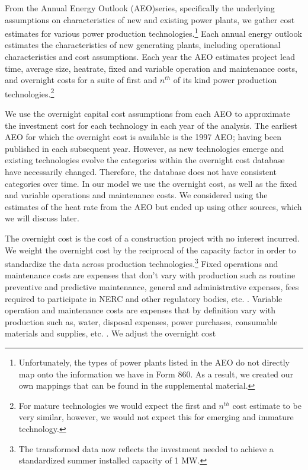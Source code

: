 \documentclass[10pt]{amsart}
\begin{document}
From the Annual Energy Outlook (AEO)series, specifically the underlying assumptions on characteristics of new and existing power plants, we gather cost estimates for various power production technologies.\footnote{Unfortunately, the types of power plants listed in the AEO do not directly map onto the information we have in Form 860.
As a result, we created our own mappings that can be found in the supplemental material.}
Each annual energy outlook estimates the characteristics of new generating plants, including operational characteristics and cost assumptions.
Each year the AEO estimates project lead time, average size, heatrate, fixed and variable operation and maintenance costs, and overnight costs for a suite of first and $n^{th}$ of its kind power production technologies.\footnote{For mature technologies we would expect the first and $n^{th}$ cost estimate to be very similar, however, we would not expect this for emerging and immature technology.}

We use the overnight capital cost assumptions from each AEO to approximate the investment cost for each technology in each year of the analysis.
The earliest AEO for which the overnight cost is available is the 1997 AEO; having been published in each subsequent year.
However, as new technologies emerge and existing technologies evolve the categories within the overnight cost database have necessarily changed. 
Therefore, the database does not have consistent categories over time. 
In our model we use the overnight cost, as well as the fixed and variable operations and maintenance costs. 
We considered using the estimates of the heat rate from the AEO but ended up using other sources, which we will discuss later. 

The overnight cost is the cost of a construction project with no interest incurred. 
We weight the overnight cost by the reciprocal of the capacity factor in order to standardize the data across production technologies.\footnote{The transformed data now reflects the investment needed to achieve a standardized summer installed capacity of 1 MW.}
Fixed operations and maintenance costs are expenses that don't vary with production such as routine preventive and predictive maintenance, general and administrative expenses, fees required to participate in NERC and other regulatory bodies, etc. \parencite{eiaupdatedcapital2010}.
Variable operation and maintenance costs are expenses that by definition vary with production such as, water, disposal expenses, power purchases, consumable materials and supplies, etc. \parencite{eiaupdatedcapital2010}. 
We adjust the overnight cost 
\end{document}
